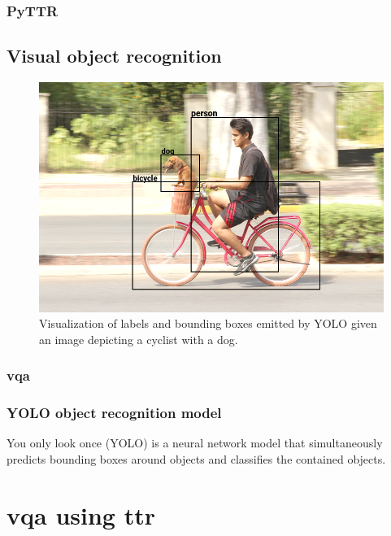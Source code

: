 \documentclass[11pt, a4paper]{article}
\begin{document}
\subsubsection{PyTTR}

\subsection{Visual object recognition}

\begin{figure}[h]
\label{fig:dogbike_annotated}
\includegraphics[width=\textwidth]{dogbike_annotated}
\centering
\caption{Visualization of labels and bounding boxes emitted by YOLO given an image depicting a cyclist with a dog.}
\end{figure}

\cite{Detectron2018}

\subsubsection{\Gls{vqa}}

\subsubsection{YOLO object recognition model}

You only look once (YOLO) \citep{RedmonYouOnlyLook2015} is a neural network model that simultaneously predicts bounding boxes around objects and classifies the contained objects.

\section{\Gls{vqa} using \gls{ttr}}
\end{document}
